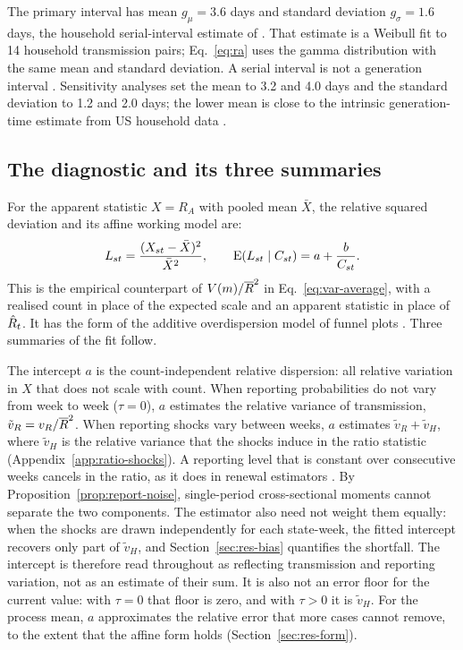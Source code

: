 The primary interval has mean $g_\mu=3.6$ days and standard deviation $g_\sigma=1.6$ days, the household serial-interval estimate of \citet{cowling2009estimation}. That estimate is a Weibull fit to 14 household transmission pairs; Eq.~\eqref{eq:ra} uses the gamma distribution with the same mean and standard deviation. A serial interval is not a generation interval \citep{vink2014serial}. Sensitivity analyses set the mean to 3.2 and 4.0 days and the standard deviation to 1.2 and 2.0 days; the lower mean is close to the intrinsic generation-time estimate from US household data \citep{chan2025estimating}.

\subsection{The diagnostic and its three summaries}
\label{sec:diag-definition}

For the apparent statistic $X=R_A$ with pooled mean $\bar X$, the relative squared deviation and its affine working model are:
\begin{equation}
L_{st}=\frac{(X_{st}-\bar X)^2}{\bar X^2},
\qquad \operatorname{E}(L_{st}\mid C_{st})=a+\frac{b}{C_{st}}.
\label{eq:affine}
\end{equation}
This is the empirical counterpart of $V(m)/\overline{R}^2$ in Eq.~\eqref{eq:var-average}, with a realised count in place of the expected scale and an apparent statistic in place of $\hat R_t$. It has the form of the additive overdispersion model of funnel plots \citep{spiegelhalter2005funnel, spiegelhalter2012statistical}. Three summaries of the fit follow.

The intercept $a$ is the count-independent relative dispersion: all relative variation in $X$ that does not scale with count. When reporting probabilities do not vary from week to week ($\tau=0$), $a$ estimates the relative variance of transmission, $\tilde v_R=v_R/\overline{R}^2$. When reporting shocks vary between weeks, $a$ estimates $\tilde v_R+\tilde v_H$, where $\tilde v_H$ is the relative variance that the shocks induce in the ratio statistic (Appendix~\ref{app:ratio-shocks}). A reporting level that is constant over consecutive weeks cancels in the ratio, as it does in renewal estimators \citep{cori2013new, gostic2020practical}. By Proposition~\ref{prop:report-noise}, single-period cross-sectional moments cannot separate the two components. The estimator also need not weight them equally: when the shocks are drawn independently for each state-week, the fitted intercept recovers only part of $\tilde v_H$, and Section~\ref{sec:res-bias} quantifies the shortfall. The intercept is therefore read throughout as reflecting transmission and reporting variation, not as an estimate of their sum. It is also not an error floor for the current value: with $\tau=0$ that floor is zero, and with $\tau>0$ it is $\tilde v_H$. For the process mean, $a$ approximates the relative error that more cases cannot remove, to the extent that the affine form holds (Section~\ref{sec:res-form}).

